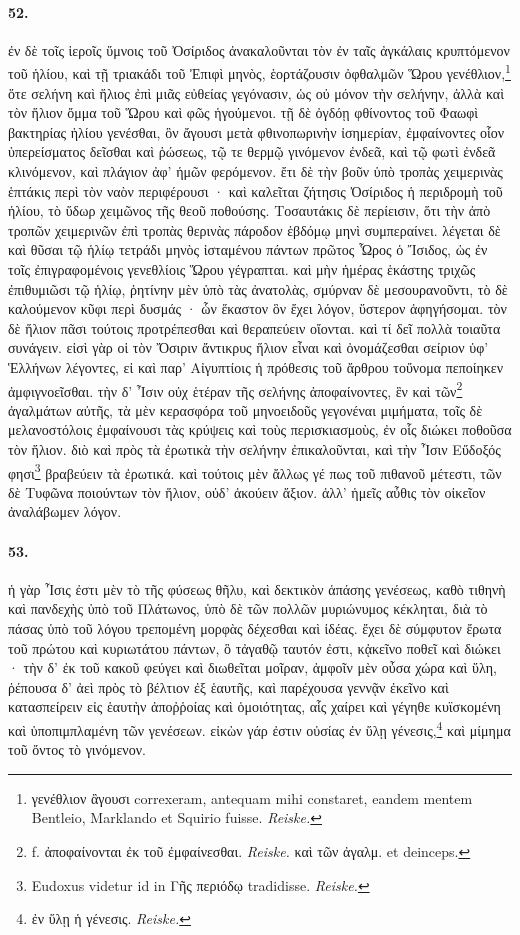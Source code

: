 \documentclass[a4paper, 11pt, oneside, polutonikogreek, german, landscape]{article}
\begin{document}
\paragraph{52.}
ἐν δὲ τοῖς ἱεροῖς ὕμνοις τοῦ Ὀσίριδος ἀνακαλοῦνται τὸν ἐν ταῖς ἀγκάλαις κρυπτόμενον τοῦ ἡλίου, καὶ τῇ τριακάδι τοῦ Ἐπιφὶ μηνὸς, ἑορτάζουσιν ὀφθαλμῶν Ὥρου γενέθλιον,\footnote{γενέθλιον ἂγουσι correxeram, antequam mihi constaret, eandem mentem Bentleio, Marklando et Squirio fuisse. \emph{Reiske.}} ὅτε σελήνη καὶ ἥλιος ἐπὶ μιᾶς εὐθείας γεγόνασιν, ὡς οὐ μόνον τὴν σελήνην, ἀλλὰ καὶ τὸν ἥλιον ὄμμα τοῦ Ὥρου καὶ φῶς ἡγούμενοι. τῇ δὲ ὀγδόῃ φθίνοντος τοῦ Φαωφὶ βακτηρίας ἡλίου γενέσθαι, ὃν ἄγουσι μετὰ φθινοπωρινὴν ἰσημερίαν, ἐμφαίνοντες οἷον ὑπερείσματος δεῖσθαι καὶ ῥώσεως, τῷ τε θερμῷ γινόμενον ἐνδεᾶ, καὶ τῷ φωτὶ ἐνδεᾶ κλινόμενον, καὶ πλάγιον ἀφ' ἡμῶν φερόμενον. ἔτι δὲ τὴν βοῦν ὑπὸ τροπὰς χειμερινὰς ἑπτάκις περὶ τὸν ναὸν περιφέρουσι · καὶ καλεῖται ζήτησις Ὀσίριδος ἡ περιδρομὴ τοῦ ἡλίου, τὸ ὕδωρ χειμῶνος τῆς θεοῦ ποθούσης. Τοσαυτάκις δὲ περίεισιν, ὅτι τὴν ἀπὸ τροπῶν χειμερινῶν ἐπὶ τροπὰς θερινὰς πάροδον ἑβδόμῳ μηνὶ συμπεραίνει. λέγεται δὲ καὶ θῦσαι τῷ ἡλίῳ τετράδι μηνὸς ἱσταμένου πάντων πρῶτος Ὧρος ὁ Ἴσιδος, ὡς ἐν τοῖς ἐπιγραφομένοις γενεθλίοις Ὥρου γέγραπται. καὶ μὴν ἡμέρας ἑκάστης τριχῶς ἐπιθυμιῶσι τῷ ἡλίῳ, ῥητίνην μὲν ὑπὸ τὰς ἀνατολὰς, σμύρναν δὲ μεσουρανοῦντι, τὸ δὲ καλούμενον κῦφι περὶ δυσμάς · ὧν ἕκαστον ὃν ἔχει λόγον, ὕστερον ἀφηγήσομαι. τὸν δὲ ἥλιον πᾶσι τούτοις προτρέπεσθαι καὶ θεραπεύειν οἴονται. καὶ τί δεῖ πολλὰ τοιαῦτα συνάγειν. εἰσὶ γὰρ οἱ τὸν Ὄσιριν ἄντικρυς ἥλιον εἶναι καὶ ὀνομάζεσθαι σείριον ὑφ' Ἑλλήνων λέγοντες, εἰ καὶ παρ' Αἰγυπτίοις ἡ πρόθεσις τοῦ ἄρθρου τοὔνομα πεποίηκεν ἀμφιγνοεῖσθαι. τὴν δ' Ἶσιν οὐχ ἑτέραν τῆς σελήνης ἀποφαίνοντες, ἓν καὶ τῶν\footnote{f. ἀποφαίνονται ἐκ τοῦ ἐμφαίνεσθαι. \emph{Reiske.} καὶ τῶν ἀγαλμ. et deinceps.} ἀγαλμάτων αὐτῆς, τὰ μὲν κερασφόρα τοῦ μηνοειδοῦς γεγονέναι μιμήματα, τοῖς δὲ μελανοστόλοις ἐμφαίνουσι τὰς κρύψεις καὶ τοὺς περισκιασμοὺς, ἐν οἷς διώκει ποθοῦσα τὸν ἥλιον. διὸ καὶ πρὸς τὰ ἐρωτικὰ τὴν σελήνην ἐπικαλοῦνται, καὶ τὴν Ἶσιν Εὔδοξός φησι\footnote{Eudoxus videtur id in Γῆς περιόδῳ tradidisse. \emph{Reiske.}} βραβεύειν τὰ ἐρωτικά. καὶ τούτοις μὲν ἄλλως γέ πως τοῦ πιθανοῦ μέτεστι, τῶν δὲ Τυφῶνα ποιούντων τὸν ἥλιον, οὐδ' ἀκούειν ἄξιον. ἀλλ' ἡμεῖς αὖθις τὸν οἰκεῖον ἀναλάβωμεν λόγον.

\paragraph{53.}
ἡ γὰρ Ἶσις ἐστι μὲν τὸ τῆς φύσεως θῆλυ, καὶ δεκτικὸν ἁπάσης γενέσεως, καθὸ τιθηνὴ καὶ πανδεχὴς ὑπὸ τοῦ Πλάτωνος, ὑπὸ δὲ τῶν πολλῶν μυριώνυμος κέκληται, διὰ τὸ πάσας ὑπὸ τοῦ λόγου τρεπομένη μορφὰς δέχεσθαι καὶ ἰδέας. ἔχει δὲ σύμφυτον ἔρωτα τοῦ πρώτου καὶ κυριωτάτου πάντων, ὃ τἀγαθῷ ταυτόν ἐστι, κᾀκεῖνο ποθεῖ καὶ διώκει · τὴν δ' ἐκ τοῦ κακοῦ φεύγει καὶ διωθεῖται μοῖραν, ἀμφοῖν μὲν οὖσα χώρα καὶ ὕλη, ῥέπουσα δ' ἀεὶ πρὸς τὸ βέλτιον ἐξ ἑαυτῆς, καὶ παρέχουσα γεννᾷν ἐκεῖνο καὶ κατασπείρειν εἰς ἑαυτὴν ἀποῤῥοίας καὶ ὁμοιότητας, αἷς χαίρει καὶ γέγηθε κυϊσκομένη καὶ ὑποπιμπλαμένη τῶν γενέσεων. εἰκὼν γάρ ἐστιν οὐσίας ἐν ὕλῃ γένεσις,\footnote{ἐν ὕλῃ ἡ γένεσις. \emph{Reiske.}} καὶ μίμημα τοῦ ὄντος τὸ γινόμενον.
\end{document}
